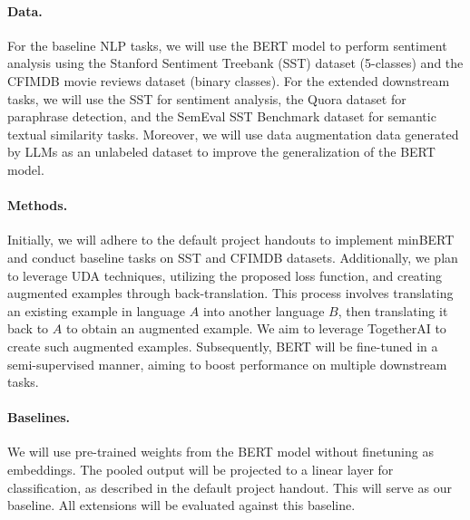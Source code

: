 \documentclass{article}
\begin{document}
\paragraph{Data.}
For the baseline NLP tasks, we will use the BERT model to perform sentiment analysis 
using the Stanford Sentiment Treebank (SST) dataset (5-classes) and the CFIMDB movie 
reviews dataset (binary classes). For the extended downstream tasks, we will use the 
SST for sentiment analysis, the Quora dataset for paraphrase detection, and the SemEval 
SST Benchmark dataset for semantic textual similarity tasks. Moreover, we will use 
data augmentation data generated by LLMs as an unlabeled dataset to improve the
generalization of the BERT model.


\paragraph{Methods.}
Initially, we will adhere to the default project handouts to implement minBERT and 
conduct baseline tasks on SST and CFIMDB datasets. Additionally, we plan to leverage 
UDA techniques, utilizing the proposed loss function, and creating augmented examples 
through back-translation. This process involves translating an existing example in 
language $A$ into another language $B$, then translating it back to $A$ to obtain an 
augmented example. We aim to leverage TogetherAI to create such augmented examples. 
Subsequently, BERT will be fine-tuned in a semi-supervised manner, aiming to boost 
performance on multiple downstream tasks.

\paragraph{Baselines.}
We will use pre-trained weights from the BERT model without finetuning as embeddings. 
The pooled output will be projected to a linear layer for classification, as described 
in the default project handout. This will serve as our baseline. All extensions will 
be evaluated against this baseline.
\end{document}
